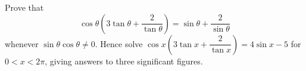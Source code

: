 Prove that
\[
\cos\theta\left(3\tan\theta+\dfrac{2}{\tan\theta}\right)
=\sin\theta+\dfrac{2}{\sin\theta}
\]
whenever $\sin\theta\cos\theta\ne0$. Hence solve
$\cos x(3\tan x+\dfrac{2}{\tan x})=4\sin x-5$ for $0<x<2\pi$, giving answers to three significant figures.
